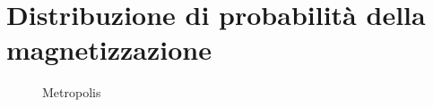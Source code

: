 \section{Distribuzione di probabilità della magnetizzazione}

\begin{figure}[h]
\centering

	\caption{Metropolis}
\end{figure}

